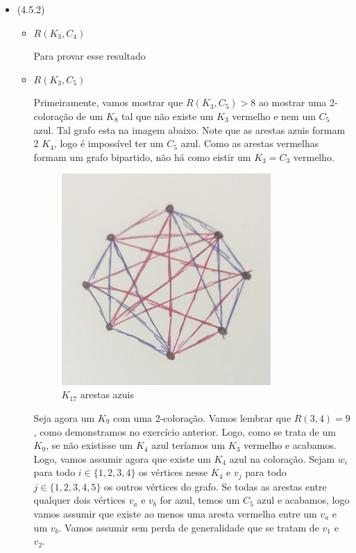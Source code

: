 \documentclass{article}
\begin{document}
\begin{itemize}
\begin{itemize}
		\end{itemize}

	\item (4.5.2)

		\begin{itemize}
			\item \(R(K_3, C_4)\)

			Para provar esse resultado

			\item \(R(K_3, C_5)\)

				Primeiramente, vamos mostrar que \(R(K_3, C_5) > 8\) ao mostrar uma 2-coloração de um \(K_8\) tal que não existe um
				\(K_3\) vermelho e nem um \(C_5\) azul. Tal grafo esta na imagem abaixo. Note que as arestas azuis formam 2 \(K_4\), logo é impossível
				ter um \(C_5\) azul. Como as arestas vermelhas formam um grafo bipartido, não há como eistir um \(K_3 = C_3\) vermelho.

			                  \begin{figure}[H]
				                  \centering
				                  \includegraphics[width=0.8\textwidth]{images/k8.jpeg}
								  \caption{\(K_{17}\) arestas azuis}
			                  \end{figure}

				Seja agora um \(K_9\) com uma 2-coloração. Vamos lembrar que \(R(3, 4) = 9\), como demonstramos no exercício anterior. Logo, como se trata
			de um \(K_9\), se não existisse um \(K_4\) azul teríamos um \(K_3\) vermelho e acabamos. Logo, vamos assumir agora que existe um \(K_4\) azul na coloração.
				Sejam \(w_i\) para todo \(i \in \{1, 2, 3, 4\}\) os vértices nesse \(K_4\) e \(v_j\) para todo \(j \in \{1, 2, 3, 4, 5\}\) os outros vértices
				do grafo. Se todas as arestas entre qualquer dois vértices \(v_a\) e \(v_b\) for azul, temos um \(C_5\) azul e acabamos, logo vamos assumir que existe ao menos uma aresta vermelha
				entre um \(v_a\) e um \(v_b\). Vamos assumir sem perda de generalidade que se tratam de \(v_1\) e \(v_2\).


\end{itemize}
\end{itemize}
\end{document}
